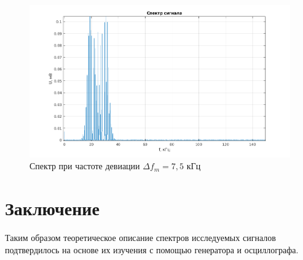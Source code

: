 \begin{figure}[h!]
    \centering
    \includegraphics[width = 15 cm]{images/4_7.5.png}
    \caption{Спектр при частоте девиации $\Delta f_m = 7,5$ кГц}
\end{figure}

\section{Заключение}

Таким образом теоретическое описание спектров исследуемых сигналов подтвердилось на основе их изучения с помощью генератора и осциллографа. 











